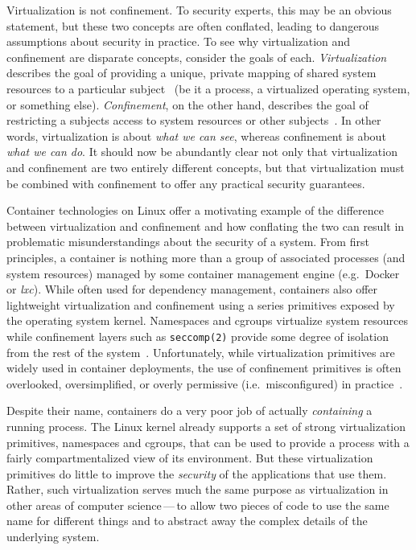 Virtualization is not confinement. To security experts, this may be an obvious statement,
but these two concepts are often conflated, leading to dangerous assumptions about
security in practice. To see why virtualization and confinement are disparate concepts,
consider the goals of each. \textit{Virtualization} describes the goal of providing
a unique, private mapping of shared system resources to a particular subject~
(be it a process, a virtualized operating system, or something else).
\textit{Confinement}, on the other hand, describes the goal of restricting a subjects
access to system resources or other subjects~. In other words, virtualization
is about \textit{what we can see}, whereas confinement is about \textit{what we can do}.
It should now be abundantly clear not only that virtualization and confinement are two
entirely different concepts, but that virtualization must be combined with confinement to
offer any practical security guarantees.

Container technologies on Linux offer a motivating example of the difference between
virtualization and confinement and how conflating the two can result in problematic
misunderstandings about the security of a system. From first principles, a container is
nothing more than a group of associated processes (and system resources) managed by some
container management engine (e.g.~Docker or \textit{lxc}). While often used for dependency
management, containers also offer lightweight virtualization and confinement using
a series primitives exposed by the operating system kernel. Namespaces and cgroups
virtualize system resources while confinement layers such as \texttt{seccomp(2)} provide
some degree of isolation from the rest of the system~. Unfortunately, while
virtualization primitives are widely used in container deployments, the use of confinement
primitives is often overlooked, oversimplified, or overly permissive (i.e.~misconfigured)
in practice~.

Despite their name, containers do a very poor job of actually \textit{containing}
a running process.  The Linux kernel already supports a set of strong virtualization
primitives, namespaces and cgroups, that can be used to provide a process with a fairly
compartmentalized view of its environment. But these virtualization primitives do little
to improve the \textit{security} of the applications that use them. Rather, such
virtualization serves much the same purpose as virtualization in other areas of computer
science\,---\,to allow two pieces of code to use the same name for different things and to
abstract away the complex details of the underlying system.

